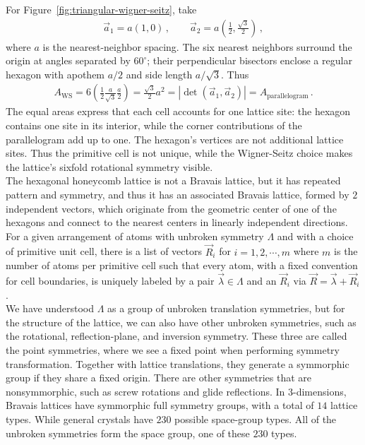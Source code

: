 \documentclass[11pt, oneside]{book}
\theoremstyle{break}
\theoremstyle{break}
\begin{document}
For Figure~\ref{fig:triangular-wigner-seitz}, take
\begin{align*}
\vec a_1=a(1,0)\,,\qquad \vec a_2=a\left(\frac12,\frac{\sqrt3}{2}\right)\,,
\end{align*}
where $a$ is the nearest-neighbor spacing. The six nearest neighbors surround the origin at angles separated by $60^\circ$; their perpendicular bisectors enclose a regular hexagon with apothem $a/2$ and side length $a/\sqrt3$. Thus
\begin{align*}
A_{\mathrm{WS}}=6\left(\frac12\frac{a}{\sqrt3}\frac a2\right)
=\frac{\sqrt3}{2}a^2
=\left|\det(\vec a_1,\vec a_2)\right|
=A_{\mathrm{parallelogram}}\,.
\end{align*}
The equal areas express that each cell accounts for one lattice site: the hexagon contains one site in its interior, while the corner contributions of the parallelogram add up to one. The hexagon's vertices are not additional lattice sites. Thus the primitive cell is not unique, while the Wigner-Seitz choice makes the lattice's sixfold rotational symmetry visible. \\

The hexagonal honeycomb lattice is not a Bravais lattice, but it has repeated pattern and symmetry, and thus it has an associated Bravais lattice, formed by $2$ independent vectors, which originate from the geometric center of one of the hexagons and connect to the nearest centers in linearly independent directions. \\


For a given arrangement of atoms with unbroken symmetry $\Lambda$ and with a choice of primitive unit cell, there is a list of vectors $\vec{R}_i$ for $i = 1,2,\cdots, m$ where $m$ is the number of atoms per primitive cell such that every atom, with a fixed convention for cell boundaries, is uniquely labeled by a pair $\vec{\lambda}\in \Lambda$ and an $\vec{R}_i$ via $\vec{R} = \vec{\lambda} + \vec{R}_i$. \\

We have understood $\Lambda$ as a group of unbroken translation symmetries, but for the structure of the lattice, we can also have other unbroken symmetries, such as the rotational, reflection-plane, and inversion symmetry. These three are called the point symmetries, where we see a fixed  point when performing symmetry transformation.
Together with lattice translations, they generate a symmorphic group if they share a fixed origin. There are other symmetries that are nonsymmorphic, such as screw rotations and glide reflections. In $3$-dimensions, Bravais lattices have  symmorphic full symmetry groups, with a total of $14$ lattice types. While general crystals have $230$ possible space-group types. All of the unbroken symmetries form the space group, one of these $230$ types. \\
\end{document}
